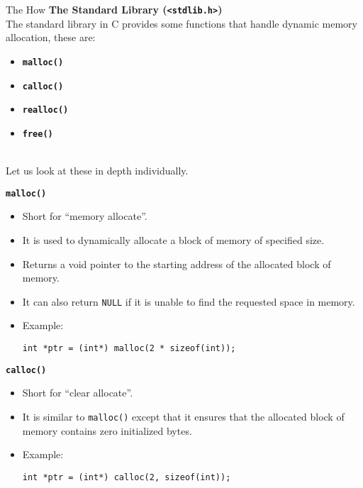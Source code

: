 \documentclass[11pt]{beamer}
\begin{document}
    \begin{frame}{The How}
        \textbf{The Standard Library (\texttt{<stdlib.h>})}\\[10pt]

        The standard library in C provides some functions that handle dynamic memory allocation, these are:\\[5pt]
        \begin{itemize}
            \item \textbf{\texttt{malloc()}}
            \item \textbf{\texttt{calloc()}}
            \item \textbf{\texttt{realloc()}}
            \item \textbf{\texttt{free()}}
        \end{itemize}
        \\[10pt]
        Let us look at these in depth individually.

        \framebreak

        \textbf{\texttt{\large malloc()}}\\[10pt]

        \begin{itemize}
            \item Short for ``memory allocate''.
            \item It is used to dynamically allocate a block of memory of specified size.
            \item Returns a void pointer to the starting address of the allocated block of memory.
            \item It can also return \texttt{NULL} if it is unable to find the requested space in memory.
            \item Example:
            \begin{tcolorbox}
                \begin{verbatim}
int *ptr = (int*) malloc(2 * sizeof(int));
                \end{verbatim}
            \end{tcolorbox}
        \end{itemize}


        \framebreak

        \textbf{\texttt{\large calloc()}}\\[10pt]

        \begin{itemize}
            \item Short for ``clear allocate''.
            \item It is similar to \texttt{malloc()} except that it ensures that the allocated block of memory
            contains zero initialized bytes.
            \item Example:
            \begin{tcolorbox}
                \begin{verbatim}
int *ptr = (int*) calloc(2, sizeof(int));
                \end{verbatim}
            \end{tcolorbox}
        \end{itemize}


\end{frame}
\end{document}
